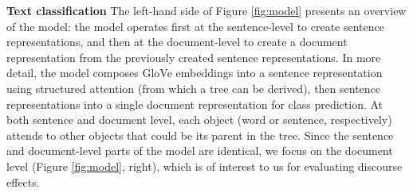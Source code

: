 \begin{table}[b]
\small
\centering
{}
\caption{Max\thinspace$|$\thinspace\ mean (standard deviation) accuracy on the test set averaged across four training runs with different initialization weights. Bolded numbers are within 1 standard deviation of the best performing model. L\&L(orig) uses the original L\&L code; L\&L(ours) includes the design change and bug fix. L\&L(report.) lists results reported by L\&L on a single training run.
}
\label{tab:results_full}
\end{table}


\smallskip
\noindent \textbf{Text classification} The left-hand side of Figure \ref{fig:model} presents an overview of the model: the model operates first at the sentence-level to create sentence representations, and then at the document-level to create a document representation from the previously created sentence representations. In more detail, the model composes GloVe embeddings \cite{Pennington:2014} into a sentence representation using structured attention (from which a tree can be derived), then sentence representations into a single document representation for class prediction. At both sentence and document level, each object (word or sentence, respectively) attends to other objects that could be its parent in the tree. Since the sentence and document-level parts of the model are identical, we focus on the document level (Figure \ref{fig:model}, right), which is of interest to us for evaluating discourse effects. 

